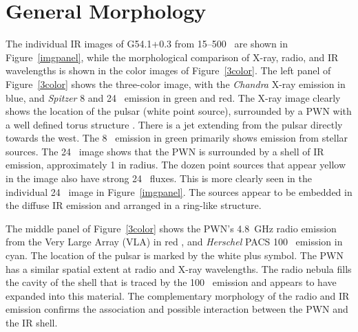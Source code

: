 \documentclass{emulateapj}
\newcommand{\chandra}{\textit{Chandra }}
\newcommand{\spitzer}{\textit{Spitzer }}
\newcommand{\herschel}{\textit{Herschel }}
\begin{document}
\section{General Morphology}\label{morph}

The individual IR images of G54.1+0.3 from 15--500 \micron\ are shown in Figure~\ref{imgpanel}, while the morphological comparison of X-ray, radio, and IR wavelengths is shown in the color images of Figure~\ref{3color}. The left panel of Figure~\ref{3color} shows the three-color image, with the \chandra X-ray emission in blue, and \spitzer 8 and 24 \micron\ emission in green and red. The X-ray image clearly shows the location of the pulsar (white point source), surrounded by a PWN with a well defined torus structure \citep{lu02,temim10}. There is a jet extending from the pulsar directly towards the west. The 8 \micron\ emission in green primarily shows emission from stellar sources. The 24 \micron\ image shows that the PWN is surrounded by a shell of IR emission, approximately 1 in radius. The dozen point sources that appear yellow in the image also have strong 24 \micron\ fluxes. This is more clearly seen in the individual 24 \micron\ image in Figure~\ref{imgpanel}. The sources appear to be embedded in the diffuse IR emission and arranged in a ring-like structure.

The middle panel of Figure~\ref{3color} shows the PWN's 4.8~GHz radio emission from the Very Large Array (VLA) in red \citep{velusamy88}, and \herschel PACS 100 \micron\ emission in cyan. The location of the pulsar is marked by the white plus symbol. The PWN has a similar spatial extent at radio and X-ray wavelengths. The radio nebula fills the cavity of the shell that is traced by the 100 \micron\ emission and appears to have expanded into this material. The complementary morphology of the radio and IR emission confirms the association and possible interaction between the PWN and the IR shell.
\end{document}
